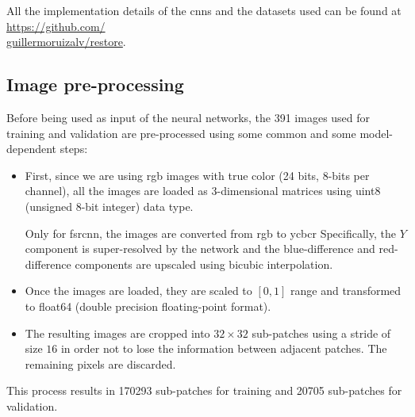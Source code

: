 All the implementation details of the \glspl{cnn} and the datasets used can be found at \href{https://github.com/guillermoruizalv/restore}{https://github.com/\\guillermoruizalv/restore}.

\subsection{Image pre-processing}
Before being used as input of the neural networks, the 391 images used for training and validation are pre-processed using some common and some model-dependent steps:
\begin{itemize}
	\item First, since we are using \gls{rgb} images with true color (24 bits, 8-bits per channel), all the images are loaded as 3-dimensional matrices using uint8 (unsigned 8-bit integer) data type.
	
	Only for \gls{fsrcnn}, the images are converted from \gls{rgb} to \gls{ycbcr} Specifically, the $Y$ component is super-resolved by the network and the blue-difference and red-difference components are upscaled using bicubic interpolation.
	
	\item Once the images are loaded, they are scaled to $[0,1]$ range and transformed to float64 (double precision floating-point format). 
	
	\item The resulting images are cropped into $32\times32$ sub-patches using a stride of size $16$ in order not to lose the information between adjacent patches. The remaining pixels are discarded.
\end{itemize}

This process results in 170293 sub-patches for training and 20705 sub-patches for validation.


